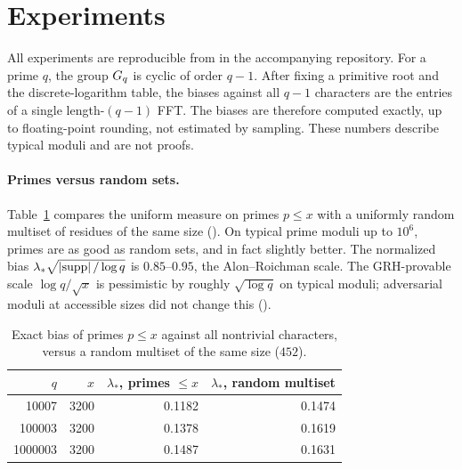 \section{Experiments}\label{sec:experiments}

All experiments are reproducible from  in the accompanying repository. For a prime $q$, the group $G_q$
is cyclic of order $q-1$. After fixing a primitive root and the discrete-logarithm table, the biases against
all $q-1$ characters are the entries of a single length-$(q-1)$ FFT. The biases are therefore computed
exactly, up to floating-point rounding, not estimated by sampling. These numbers describe typical moduli
and are not proofs.

\paragraph{Primes versus random sets.}
Table~\ref{tab:typical} compares the uniform measure on primes $p\le x$ with a uniformly random multiset of
residues of the same size (). On typical prime moduli up to $10^6$, primes are as good as
random sets, and in fact slightly better. The normalized bias $\lambda_*\sqrt{\left\lvert \mathrm{supp} \right\rvert/\log q}$ is
$0.85$--$0.95$, the Alon--Roichman scale. The GRH-provable scale $\log q/\sqrt x$ is pessimistic by roughly
$\sqrt{\log q}$ on typical moduli; adversarial moduli at accessible sizes did not change this
().

\begin{table}[ht]
\centering
\begin{tabular}{rrrr}
\toprule
$q$ & $x$ & $\lambda_*$, primes $\le x$ & $\lambda_*$, random multiset\\
\midrule
10007 & 3200 & 0.1182 & 0.1474\\
100003 & 3200 & 0.1378 & 0.1619\\
1000003 & 3200 & 0.1487 & 0.1631\\
\bottomrule
\end{tabular}
\caption{Exact bias of primes $p\le x$ against all nontrivial characters, versus a random multiset of the same
size ($452$).}\label{tab:typical}
\end{table}

